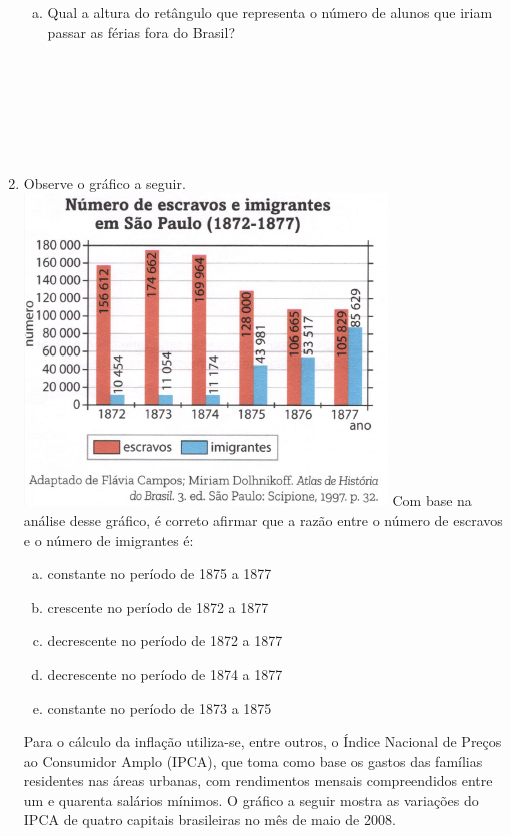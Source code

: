 \documentclass[a4paper,14pt]{article}
\begin{document}
\begin{multicols}{2}
\begin{enumerate}
\begin{enumerate}[a)]
				\item Qual a altura do retângulo que representa o número de alunos que iriam passar as férias fora do Brasil? \\\\\\\\\\\\\\
			\end{enumerate}
			\item Observe o gráfico a seguir.
			\includegraphics[width=1\linewidth]{6FMA119_imagens/imagem4}
			Com base na análise desse gráfico, é correto afirmar que a razão entre o número de escravos e o número de imigrantes é:
			\begin{enumerate}[a)]
				\item constante no período de 1875 a 1877
				\item crescente no período de 1872 a 1877
				\item decrescente no período de 1872 a 1877
				\item decrescente no período de 1874 a 1877
				\item constante no período de 1873 a 1875
			\end{enumerate}
			Para o cálculo da inflação utiliza-se, entre outros, o Índice Nacional de Preços ao Consumidor Amplo (IPCA), que toma como base os gastos das famílias residentes nas áreas urbanas, com rendimentos mensais compreendidos entre um e quarenta salários mínimos. O gráfico a seguir mostra as variações do IPCA de quatro capitais brasileiras no mês de maio de 2008. \\

\end{enumerate}
\end{multicols}
\end{document}
